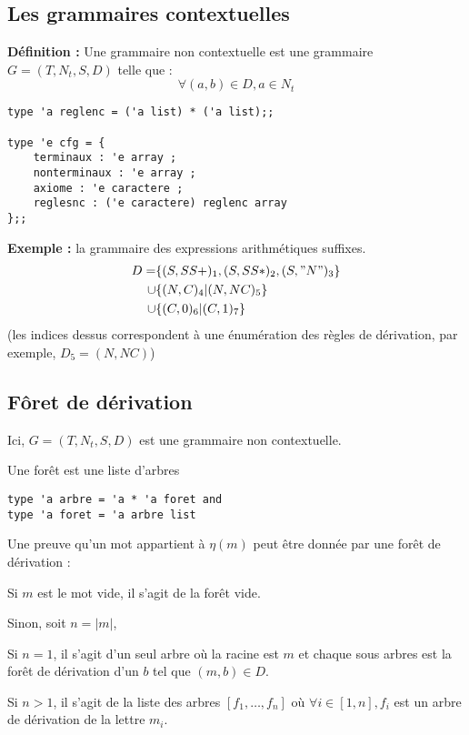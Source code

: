 \documentclass[a4paper,10pt]{article}
\newlength{\mydepth}
\newlength{\myheight}
\newenvironment{answer}%
{\par\begin{lrbox}{\mybox}\quad\begin{minipage}{\linewidth}\color{black}\setlength{\parskip}{10pt plus 1pt minus 1pt}\vspace*{-.7\baselineskip}}%
{\end{minipage}\end{lrbox}%
\settodepth{\mydepth}{\usebox{\mybox}}%
\settoheight{\myheight}{\usebox{\mybox}}%
\addtolength{\myheight}{\mydepth}%
\noindent\makebox[0pt]{%
  \color{gray}\hspace{-0pt}\rule[-\mydepth]{1pt}{\myheight}}%
  \usebox{\mybox}%
  }
\begin{document}
\subsection{Les grammaires contextuelles}

\textbf{  Définition : } Une grammaire non contextuelle est une grammaire $G = (T,N_t,S,D)$ telle que :
\begin{equation*} \forall (a,b) \in D, a \in N_t  \end{equation*}


\begin{verbatim}
type 'a reglenc = ('a list) * ('a list);;

type 'e cfg = {
    terminaux : 'e array ;
    nonterminaux : 'e array ;
    axiome : 'e caractere ;
    reglesnc : ('e caractere) reglenc array 
};;
\end{verbatim}

\textbf{ Exemple : } la grammaire des expressions arithmétiques suffixes.
\begin{align*}
D = &\{(S,SS+)_1,(S,SS*)_2,(S,"N")_3\}\\
\cup&\{(N,C)_4 | (N,NC)_5\}\\
\cup&\{(C,0)_6 | (C,1)_7\}
\end{align*}
(les indices dessus correspondent à une énumération des règles de dérivation, par exemple, $D_5 = (N,NC)$)

\subsection{Fôret de dérivation}

Ici, $G = (T,N_t,S,D)$ est une grammaire non contextuelle.

Une forêt est une liste d'arbres
\begin{verbatim}
type 'a arbre = 'a * 'a foret and
type 'a foret = 'a arbre list
\end{verbatim}


Une preuve qu'un mot appartient à $\eta(m)$ peut être donnée par une forêt de dérivation :

\begin{answer} 
Si $m$ est le mot vide, il s'agit de la forêt vide.

Sinon, soit $n = |m|$,\\
\begin{answer} 
    Si $n=1$, il s'agit d'un seul arbre où la racine est $m$ et chaque sous arbres est la forêt de dérivation d'un $b$ tel que $(m,b) \in D$.

    Si $n>1$, il s'agit de la liste des arbres $[f_1, \dots, f_n]$ où $\forall i \in [1,n], f_i$ est un arbre de dérivation de la lettre $m_i$.
\end{answer}
\end{answer}
\end{document}

